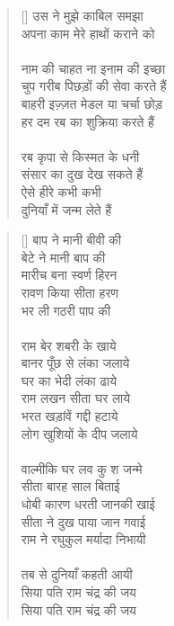 \begin{verse}[\versewidth]
{उस ने मुझे काबिल समझा\\
अपना काम मेरे हाथों कराने को\\
\\
नाम की चाहत ना इनाम की इच्छा\\
चुप गरीब पिछड़ों की सेवा करते हैं\\
बाहरी इज़्ज़त मेडल या चर्चा छोड़\\
हर दम रब का शुक्रिया करते हैं\\
\\
रब कृपा से किस्मत के धनी\\
संसार का दुख देख सकते हैं\\
ऐसे हीरे कभी कभी\\
दुनियाँ में जन्म लेते हैं
}\end{verse}

\begin{verse}[\versewidth]\texthindi{
बाप ने मानी बीवी की\\
बेटे ने मानी बाप की\\
मारीच बना स्वर्ण हिरन\\
रावण किया सीता हरण\\
भर ली गठरी पाप की\\
 \\
राम बेर शबरी के खाये\\
बानर पूँछ से लंका जलाये\\
घर का भेदी लंका ढाये\\
राम लखन सीता घर लाये\\
भरत खड़ांवें गद्दी हटाये\\
लोग खुशियों के दीप जलाये\\
\\
वाल्मीकि घर लव कु श जन्मे\\
सीता बारह साल बिताई\\
धोबी कारण धरती जानकी खाई\\
सीता ने दुख पाया जान गवाई\\
राम ने रघुकुल मर्यादा निभायी\\
\\
तब से दुनियाँ कहती आयी\\
सिया पति राम चंद्र की जय\\
सिया पति राम चंद्र की जय\\
}\end{verse}

